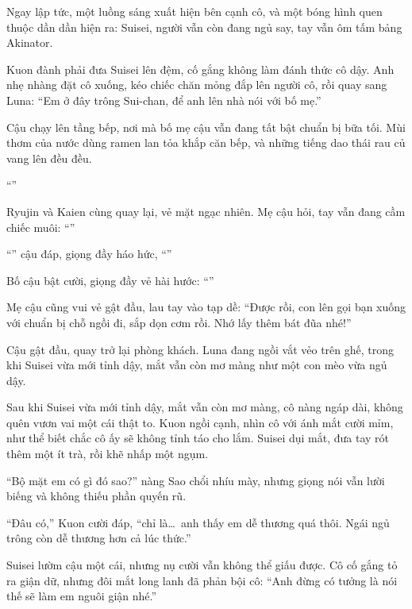 \documentclass[../main.tex]{subfiles}
\begin{document}
Ngay lập tức, một luồng sáng xuất hiện bên cạnh cô, và một bóng hình quen thuộc dần dần hiện ra: Suisei, người vẫn còn đang ngủ say, tay vẫn ôm tấm bảng Akinator.

Kuon đành phải đưa Suisei lên đệm, cố gắng không làm đánh thức cô dậy. Anh nhẹ nhàng đặt cô xuống, kéo chiếc chăn mỏng đắp lên người cô, rồi quay sang Luna: ``Em ở đây trông Sui-chan, để anh lên nhà nói với bố mẹ.''

Cậu chạy lên tầng bếp, nơi mà bố mẹ cậu vẫn đang tất bật chuẩn bị bữa tối. Mùi thơm của nước dùng ramen lan tỏa khắp căn bếp, và những tiếng dao thái rau củ vang lên đều đều.

``''

Ryujin và Kaien cùng quay lại, vẻ mặt ngạc nhiên. Mẹ cậu hỏi, tay vẫn đang cầm chiếc muôi: ``''

``'' cậu đáp, giọng đầy háo hức, ``''

Bố cậu bật cười, giọng đầy vẻ hài hước: ``''

Mẹ cậu cũng vui vẻ gật đầu, lau tay vào tạp dề: ``Được rồi, con lên gọi bạn xuống với chuẩn bị chỗ ngồi đi, sắp dọn cơm rồi. Nhớ lấy thêm bát đũa nhé!''

Cậu gật đầu, quay trở lại phòng khách. Luna đang ngồi vắt vẻo trên ghế, trong khi Suisei vừa mới tỉnh dậy, mắt vẫn còn mơ màng như một con mèo vừa ngủ dậy.

Sau khi Suisei vừa mới tỉnh dậy, mắt vẫn còn mơ màng, cô nàng ngáp dài, không quên vươn vai một cái thật to. Kuon ngồi cạnh, nhìn cô với ánh mắt cười mỉm, như thể biết chắc cô ấy sẽ không tỉnh táo cho lắm. Suisei dụi mắt, đưa tay rót thêm một ít trà, rồi khẽ nhấp một ngụm.

``Bộ mặt em có gì đó sao?'' nàng Sao chổi nhíu mày, nhưng giọng nói vẫn lười biếng và không thiếu phần quyến rũ.

``Đâu có,'' Kuon cười đáp, ``chỉ là\dots\ anh thấy em dễ thương quá thôi. Ngái ngủ trông còn dễ thương hơn cả lúc thức.''

Suisei lườm cậu một cái, nhưng nụ cười vẫn không thể giấu được. Cô cố gắng tỏ ra giận dữ, nhưng đôi mắt long lanh đã phản bội cô: ``Anh đừng có tưởng là nói thế sẽ làm em nguôi giận nhé.''
\end{document}
